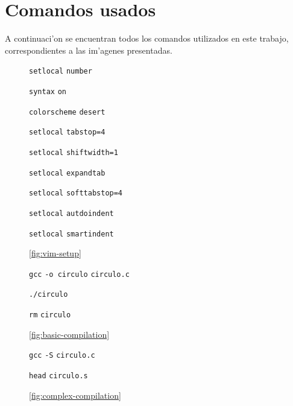 \documentclass[11pt]{article}
\newcommand{\codetext}[2]{\large\texttt{\textcolor{#1}{#2}}}
\newcommand{\imagecaption}[1]{\vspace{-7pt}\caption*{\char91\ref{fig:#1}\char93}}
\begin{document}
		
	\section{Comandos usados}
		A continuaci'on se encuentran todos los comandos utilizados en este trabajo, correspondientes a las im'agenes presentadas.
		
		\begin{figure}[H]
			\centering
			\begin{code-box}
				\codetext{light-blue}{setlocal} \codetext{light-red}{number}
				
				\codetext{light-blue}{syntax} \codetext{light-red}{on}

				\codetext{light-blue}{colorscheme} \codetext{light-red}{desert}
				
				\codetext{light-blue}{setlocal} \codetext{light-red}{tabstop=4}

				\codetext{light-blue}{setlocal} \codetext{light-red}{shiftwidth=1}
				
				\codetext{light-blue}{setlocal} \codetext{light-red}{expandtab}
				
				\codetext{light-blue}{setlocal} \codetext{light-red}{softtabstop=4}
				
				\codetext{light-blue}{setlocal} \codetext{light-red}{autdoindent}
				
				\codetext{light-blue}{setlocal} \codetext{light-red}{smartindent}
			\end{code-box}
			\imagecaption{vim-setup}
		\end{figure}
		
		\begin{figure}[H]
			\centering
			\begin{code-box}
				\codetext{light-blue}{gcc} \codetext{orange-desert-vim}{-o circulo} \codetext{light-red}{circulo.c}
				
				\codetext{light-blue}{./circulo}
				
				\codetext{light-blue}{rm} \codetext{light-red}{circulo}
			\end{code-box}
			\imagecaption{basic-compilation}
		\end{figure}
		
		\begin{figure}[H]
			\centering
			\begin{code-box}
				\codetext{light-blue}{gcc} \codetext{orange-desert-vim}{-S} \codetext{light-red}{circulo.c}
				
				\codetext{light-blue}{head} \codetext{light-red}{circulo.s}
			\end{code-box}
			\imagecaption{complex-compilation}
		\end{figure}
		
\end{document}
